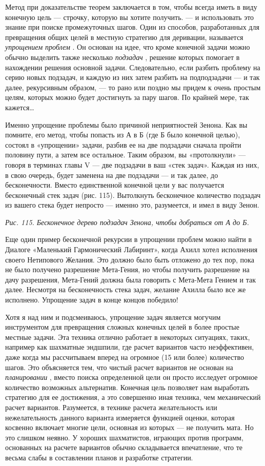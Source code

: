 \documentclass[../main.tex]{subfiles}
\begin{document}
Метод при доказательстве теорем заключается в том, чтобы всегда иметь в виду конечную цель --- строчку, которую вы хотите получить. --- и использовать это знание при поиске промежуточных шагов. Один из способов, разработанных для превращения общих целей в местную стратегию для деривации, называется \emph{упрощением проблем} . Он основан на идее, что кроме конечной задачи можно обычно выделить также несколько \emph{подзадач} , решение которых помогает в нахождении решения основной задачи. Следовательно, если разбить проблему на серию новых подзадач, и каждую из них затем разбить на подподзадачи --- и так далее, рекурсивным образом, --- то рано или поздно мы придем к очень простым целям, которых можно будет достигнуть за пару шагов. По крайней мере, так кажется\ldots{}

Именно упрощение проблемы было причиной неприятностей Зенона. Как вы помните, его метод, чтобы попасть из А в Б (где Б было конечной целью), состоял в «упрощении» задачи, разбив ее на две подзадачи сначала пройти половину пути, а затем все остальное. Таким образом, вы «протолкнули» --- говоря в терминах главы V --- две подзадачи в ваш «стек задач». Каждая из них, в свою очередь, будет заменена на две подзадачи --- и так далее, до бесконечности. Вместо единственной конечной цели у вас получается бесконечный стек задач (рис. 115). Вытолкнуть бесконечное количество подзадач из вашего стека будет непросто --- именно это, разумеется, и имел в виду Зенон.

\emph{Рис. 115. Бесконечное дерево подзадач Зенона, чтобы добраться от А до Б.}

Еще один пример бесконечной рекурсии в упрощении проблем можно найти в Диалоге «Маленький Гармонический Лабиринт», когда Ахилл хотел исполнения своего Нетипового Желания. Это должно было быть отложено до тех пор, пока не было получено разрешение Мета-Гения, но чтобы получить разрешение на дачу разрешения, Мета-Гений должна была говорить с Мета-Мета Гением и так далее. Несмотря на бесконечность стека задач, желание Ахилла было все же исполнено. Упрощение задач в конце концов победило!

Хотя я над ним и подсмеиваюсь, упрощение задач является могучим инструментом для превращения сложных конечных целей в более простые местные задачи. Эта техника отлично работает в некоторых ситуациях, таких, например как шахматные эндшпили, где расчет вариантов часто неэффективен, даже когда мы рассчитываем вперед на огромное (15 или более) количество шагов. Это объясняется тем, что чистый расчет вариантов не основан на \emph{планировании} , вместо поиска определенной цели он просто исследует огромное количество возможных альтернатив. Конечная цель позволяет нам выработать стратегию для ее достижения, а это совершенно иная техника, чем механический расчет вариантов. Разумеется, в технике расчета желательность или нежелательность данного варианта измеряется функцией оценки, которая косвенно включает многие цели, основная из которых --- не получить мата. Но это слишком неявно. У хороших шахматистов, играющих против программ, основанных на расчете вариантов обычно складывается впечатление, что те весьма слабы в составлении планов и разработке стратегии.
\end{document}
